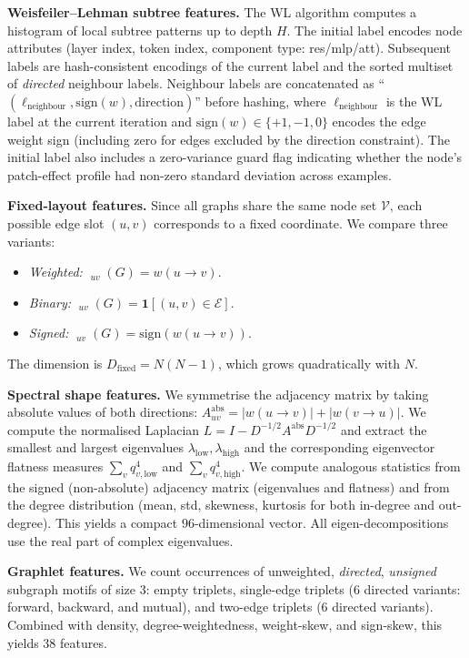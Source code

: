 \documentclass[11pt,a4paper]{article}
\newcommand{\sign}{\mathrm{sign}}
\newcommand{\node}{\mathcal{V}}
\newcommand{\edge}{\mathcal{E}}
\newcommand{\weight}{w}
\newcommand{\fixlayout}{\mathop{\phi_{\mathrm{fixed}}}\nolimits}
\begin{document}
\textbf{Weisfeiler--Lehman subtree features.} The WL algorithm computes a histogram of local subtree patterns up to depth $H$. The initial label encodes node attributes (layer index, token index, component type: res/mlp/att). Subsequent labels are hash-consistent encodings of the current label and the sorted multiset of \emph{directed} neighbour labels. Neighbour labels are concatenated as ``$(\ell_{\text{neighbour}}, \sign(w), \text{direction})$'' before hashing, where $\ell_{\text{neighbour}}$ is the WL label at the current iteration and $\sign(w) \in \{+1, -1, 0\}$ encodes the edge weight sign (including zero for edges excluded by the direction constraint). The initial label also includes a zero-variance guard flag indicating whether the node's patch-effect profile had non-zero standard deviation across examples.

\textbf{Fixed-layout features.} Since all graphs share the same node set $\node$, each possible edge slot $(u, v)$ corresponds to a fixed coordinate. We compare three variants:
\begin{itemize}
\item \textit{Weighted:} $\fixlayout_{uv}(G) = \weight(u \rightarrow v)$.
\item \textit{Binary:} $\fixlayout_{uv}(G) = \mathbf{1}[(u, v) \in \edge]$.
\item \textit{Signed:} $\fixlayout_{uv}(G) = \sign(\weight(u \rightarrow v))$.
\end{itemize}
The dimension is $D_{\mathrm{fixed}} = N(N-1)$, which grows quadratically with $N$.

\textbf{Spectral shape features.} We symmetrise the adjacency matrix by taking absolute values of both directions: $A^{\mathrm{abs}}_{uv} = |\weight(u \rightarrow v)| + |\weight(v \rightarrow u)|$. We compute the normalised Laplacian $L = I - D^{-1/2} A^{\mathrm{abs}} D^{-1/2}$ and extract the smallest and largest eigenvalues $\lambda_{\mathrm{low}}, \lambda_{\mathrm{high}}$ and the corresponding eigenvector flatness measures $\sum_v q_{v,\mathrm{low}}^4$ and $\sum_v q_{v,\mathrm{high}}^4$. We compute analogous statistics from the signed (non-absolute) adjacency matrix (eigenvalues and flatness) and from the degree distribution (mean, std, skewness, kurtosis for both in-degree and out-degree). This yields a compact $96$-dimensional vector. All eigen-decompositions use the real part of complex eigenvalues.

\textbf{Graphlet features.} We count occurrences of unweighted, \emph{directed}, \emph{unsigned} subgraph motifs of size $3$: empty triplets, single-edge triplets (6 directed variants: forward, backward, and mutual), and two-edge triplets (6 directed variants). Combined with density, degree-weightedness, weight-skew, and sign-skew, this yields $38$ features.
\end{document}

